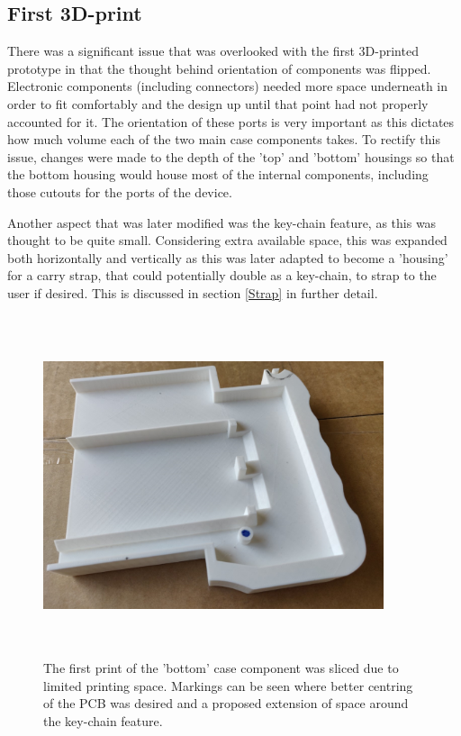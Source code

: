 \subsection{First 3D-print} \label{First Print}

There was a significant issue that was overlooked with the first 3D-printed prototype in that the thought behind orientation of components was flipped.
Electronic components (including connectors) needed more space underneath in order to fit comfortably and the design up until that point had not properly accounted for it.
The orientation of these ports is very important as this dictates how much volume each of the two main case components takes.
To rectify this issue, changes were made to the depth of the 'top' and 'bottom' housings so that the bottom housing would house most of the internal components, including those cutouts for the ports of the device.

Another aspect that was later modified was the key-chain feature, as this was thought to be quite small.
Considering extra available space, this was expanded both horizontally and vertically as this was later adapted to become a 'housing' for a carry strap, that could potentially double as a key-chain, to strap to the user if desired.
This is discussed in section \ref{Strap} in further detail.

\begin{figure} [h]
    \centering
    \includegraphics[width=10cm,height=10cm,keepaspectratio]{Figures/firstprint.png}
    \caption{The first print of the 'bottom' case component was sliced due to limited printing space. Markings can be seen where better centring of the PCB was desired and a proposed extension of space around the key-chain feature.}
    \label{fig:First}
\end{figure}


